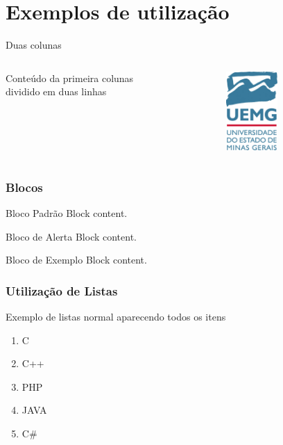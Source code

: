 \documentclass[compress]{beamer}
\begin{document}
\section{Exemplos de utilização}

\begin{frame}[fragile]{Duas colunas}
     \begin{columns}[T] %
     \begin{column}[T]{5cm} %
     Conteúdo da primeira colunas \\ dividido em duas linhas
     \end{column}
     \begin{column}[T]{5cm} %
          \includegraphics[height=3cm]{figuras/UEMG_vertical.jpg}
     \end{column}
     \end{columns}
\end{frame}

\begin{frame}
  \frametitle{Blocos}
  \begin{block}{Bloco Padrão}
        Block content.
      \end{block}

      \begin{alertblock}{Bloco de Alerta}
        Block content.
      \end{alertblock}

      \begin{exampleblock}{Bloco de Exemplo}
        Block content.
      \end{exampleblock}
\end{frame}

\begin{frame}
    \frametitle{Utilização de Listas}
    Exemplo de listas normal aparecendo todos os itens
    \begin{enumerate}
        \vfill \item {C}
        \vfill \item {C++}
        \vfill \item {PHP}
        \vfill \item {JAVA}
        \vfill \item {C\#}
    \end{enumerate}
\end{frame}
\end{document}
